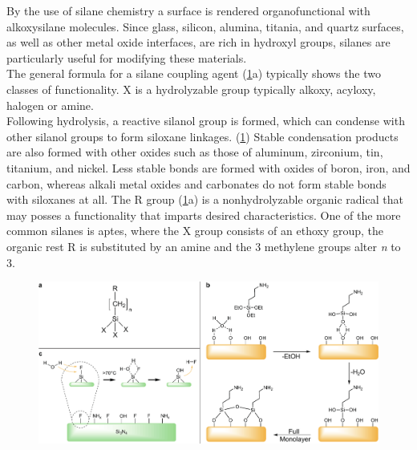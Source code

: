By the use of silane chemistry a surface is rendered organofunctional with alkoxysilane molecules. Since glass, silicon, alumina, titania, and quartz surfaces, as well as other metal oxide interfaces, are rich in hydroxyl groups, silanes are particularly useful for modifying these materials.\cite{lit:chem:silanizingGlass}\\The general formula for a silane coupling agent (\cref{fig:chem:APTES}a) typically shows the two classes of functionality. X is a hydrolyzable group typically alkoxy, acyloxy, halogen or amine.
\\
Following hydrolysis, a reactive \gls{silanol} group is formed, which can condense with other silanol groups to form \gls{siloxane} linkages. 
(\cref{fig:chem:APTES}) Stable condensation products are also formed with other oxides such as those of aluminum, zirconium, tin, titanium, and nickel. Less stable bonds are formed with oxides of boron, iron, and carbon, whereas alkali metal oxides and carbonates do not form stable bonds with \glspl{siloxane} at all. The R group (\cref{fig:chem:APTES}a) is a nonhydrolyzable organic radical that may posses a functionality that imparts desired characteristics. One of the more common silanes is \gls{aptes}, where the X group consists of an \gls{ethoxy} group, the organic rest R is substituted by an \gls{amine} and the 3 \gls{methylene} groups alter \textit{n} to 3.\cite{lit:chem:GELEST} 
\begin{figure}[h]
	\centering
	\includegraphics[width=\linewidth]{./Ressources/Chemistry/SiN-APTES-Silane.pdf}
	\label{fig:chem:APTES}
\end{figure}
